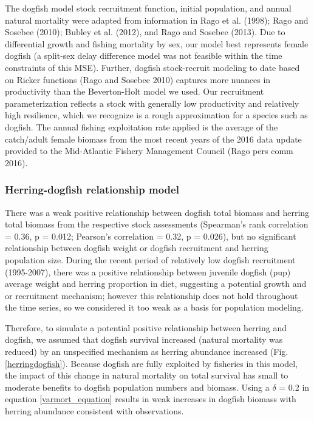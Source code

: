 \documentclass[]{article}
\begin{document}
The dogfish model stock recruitment function, initial population, and
annual natural mortality were adapted from information in Rago et al.
(1998); Rago and Sosebee (2010); Bubley et al. (2012), and Rago and
Sosebee (2013). Due to differential growth and fishing mortality by sex,
our model best represents female dogfish (a split-sex delay difference
model was not feasible within the time constraints of this MSE).
Further, dogfish stock-recruit modeling to date based on Ricker
functions (Rago and Sosebee 2010) captures more nuances in productivity
than the Beverton-Holt model we used. Our recruitment parameterization
reflects a stock with generally low productivity and relatively high
resilience, which we recognize is a rough approximation for a species
such as dogfish. The annual fishing exploitation rate applied is the
average of the catch/adult female biomass from the most recent years of
the 2016 data update provided to the Mid-Atlantic Fishery Management
Council (Rago pers comm 2016).

\subsubsection{Herring-dogfish relationship
model}\label{herring-dogfish-relationship-model}

There was a weak positive relationship between dogfish total biomass and
herring total biomass from the respective stock assessments (Spearman's
rank correlation = 0.36, p = 0.012; Pearson's correlation = 0.32, p =
0.026), but no significant relationship between dogfish weight or
dogfish recruitment and herring population size. During the recent
period of relatively low dogfish recruitment (1995-2007), there was a
positive relationship between juvenile dogfish (pup) average weight and
herring proportion in diet, suggesting a potential growth and or
recruitment mechanism; however this relationship does not hold
throughout the time series, so we considered it too weak as a basis for
population modeling.

Therefore, to simulate a potential positive relationship between herring
and dogfish, we assumed that dogfish survival increased (natural
mortality was reduced) by an unspecified mechanism as herring abundance
increased (Fig. \ref{herringdogfish}). Because dogfish are fully
exploited by fisheries in this model, the impact of this change in
natural mortality on total survival has small to moderate benefits to
dogfish population numbers and biomass. Using a \(\delta\) = 0.2 in
equation \ref{varmort_equation} results in weak increases in dogfish
biomass with herring abundance consistent with observations.
\end{document}

